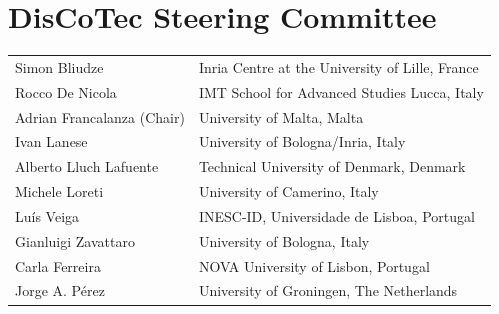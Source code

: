 \documentclass[]{llncs}
\begin{document}
\section*{DisCoTec Steering Committee}
\begin{longtable}{p{}p{}}
Simon Bliudze & Inria Centre at the University of Lille, France\\
Rocco De Nicola & IMT School for Advanced Studies Lucca, Italy\\
Adrian Francalanza (Chair) & University of Malta, Malta\\
Ivan Lanese & University of Bologna/Inria, Italy\\
Alberto Lluch Lafuente & Technical University of Denmark, Denmark\\
Michele Loreti & University of Camerino, Italy\\
Lu\'is Veiga & INESC-ID, Universidade de Lisboa, Portugal\\
Gianluigi Zavattaro & University of Bologna, Italy\\
Carla Ferreira & NOVA University of Lisbon, Portugal\\
Jorge A. P\'erez & University of Groningen, The Netherlands
\end{longtable}

\clearpage
\end{document}
